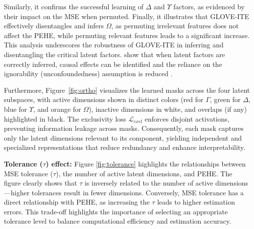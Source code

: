 \documentclass[doubleblind]{ecai}
\begin{document}
	Similarly, it confirms the successful learning of $\Delta$ and $\Upsilon$ factors, as evidenced by their impact on the MSE when permuted. Finally, it illustrates that GLOVE-ITE effectively disentangles and infers $\Omega$, as permuting irrelevant features does not affect the PEHE, while permuting relevant features leads to a significant increase. This analysis underscores the robustness of GLOVE-ITE in inferring and disentangling the critical latent factors. \citet{CEVAE,lowe2022amortized} show that when latent factors are correctly inferred, causal effects can be identified and the reliance on the ignorability (unconfoundedness) assumption is reduced \citep{vowels2021targeted}. 
	
	Furthermore, Figure~\ref{fig:ortho} visualizes the learned masks across the four latent subspaces, 
	with active dimensions shown in distinct colors (red for $\Gamma$, green for $\Delta$, blue for $\Upsilon$, and orange for $\Omega$), 
	inactive dimensions in white, and overlaps (if any) highlighted in black. 
	The exclusivity loss $\mathcal{L}_{\mathit{excl}}$ enforces disjoint activations, preventing information leakage across masks. 
	Consequently, each mask captures only the latent dimensions relevant to its component, yielding independent and specialized representations 
	that reduce redundancy and enhance interpretability.
	
	

	
	
	
	
	\textbf{Tolerance ($\tau$) effect:} Figure \ref{fig:tolerance} highlights the relationships between MSE tolerance ($\tau$), the number of active latent dimensions, and PEHE. The figure clearly shows that $\tau$ is inversely related to the number of active dimensions—higher tolerances result in fewer dimensions. Conversely, MSE tolerance has a direct relationship with PEHE, as increasing the $\tau$ leads to higher estimation errors. This trade-off highlights the importance of selecting an appropriate tolerance level to balance computational efficiency and estimation accuracy. 
	
\end{document}
